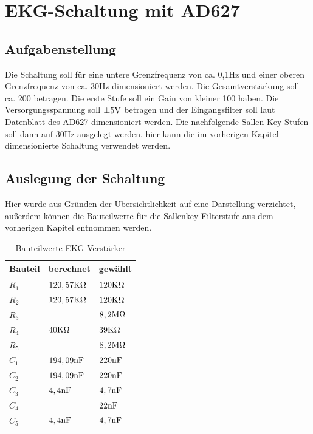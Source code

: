 \section{EKG-Schaltung mit AD627}
\subsection{Aufgabenstellung}
Die Schaltung soll für eine untere Grenzfrequenz von ca. 0,1Hz und einer oberen Grenzfrequenz von ca. 30Hz dimensioniert werden. Die Gesamtverstärkung soll ca. 200 betragen. Die erste Stufe soll ein Gain von kleiner 100 haben. Die Versorgungsspannung soll $\pm5\text{V}$ betragen und der Eingangsfilter soll laut Datenblatt des AD627 dimensioniert werden. Die nachfolgende Sallen-Key Stufen soll dann auf 30Hz ausgelegt werden. hier kann die im vorherigen Kapitel dimensionierte Schaltung verwendet werden.


\subsection{Auslegung der Schaltung}
Hier wurde aus Gründen der Übersichtlichkeit auf eine Darstellung verzichtet, außerdem können die Bauteilwerte für die Sallenkey Filterstufe aus dem vorherigen Kapitel entnommen werden.
\begin{table}[H]
\centering
\caption{Bauteilwerte EKG-Verstärker}
\label{tab:Vals_EKG_Verst}
\begin{tabular}{|l|l|l|}
\hline
\rowcolor[HTML]{C0C0C0} 
Bauteil & berechnet      & gewählt     \\ \hline
$R_1$   & $120,57\text{K}\Omega$ & $120\text{K}\Omega$ \\ \hline
$R_2$   & $120,57\text{K}\Omega$ & $120\text{K}\Omega$ \\ \hline
$R_3$   &                & $8,2\text{M}\Omega$ \\ \hline
$R_4$   & $40\text{K}\Omega$     & $39\text{K}\Omega$  \\ \hline
$R_5$   &                & $8,2\text{M}\Omega$ \\ \hline
$C_1$   & $194,09\text{nF}$    & $220\text{nF}$    \\ \hline
$C_2$   & $194,09\text{nF}$    & $220\text{nF}$    \\ \hline
$C_3$   & $4,4\text{nF}$       & $4,7\text{nF}$    \\ \hline
$C_4$   &                & $22\text{nF}$     \\ \hline
$C_5$   & $4,4\text{nF}$       & $4,7\text{nF}$    \\ \hline
\end{tabular}
\end{table}

